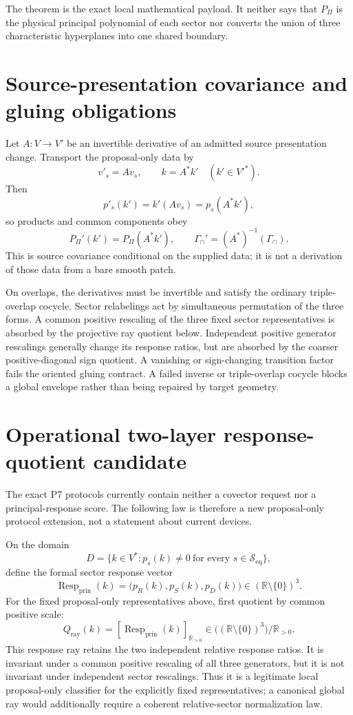 \documentclass[11pt]{article}
\newcommand{\RR}{\mathbb R}
\newcommand{\Seq}{\mathcal S_{\mathrm{eq}}}
\newcommand{\Pprod}{P_{\Pi}}
\newcommand{\GammaInt}{\Gamma_{\cap}}
\newcommand{\Resp}{\operatorname{Resp}_{\mathrm{prin}}}
\newcommand{\Qray}{Q_{\mathrm{ray}}}
\begin{document}
The theorem is the exact local mathematical payload.  It neither says that
\(\Pprod\) is the physical principal polynomial of each sector nor converts
the union of three characteristic hyperplanes into one shared boundary.

\section{Source-presentation covariance and gluing obligations}

Let \(A:V\to V'\) be an invertible derivative of an admitted source
presentation change.  Transport the proposal-only data by
\[
 v'_s=A v_s,\qquad k=A^*k'\quad(k'\in V'^*).
\]
Then
\[
 p'_s(k')=k'(A v_s)=p_s(A^*k'),
\]
so products and common components obey
\[
 \Pprod'(k')=\Pprod(A^*k'),
 \qquad
 \GammaInt'=(A^*)^{-1}(\GammaInt).
\]
This is source covariance conditional on the supplied data; it is not a
derivation of those data from a bare smooth patch.

On overlaps, the derivatives must be invertible and satisfy the ordinary
triple-overlap cocycle.  Sector relabelings act by simultaneous permutation of
the three forms.  A common positive rescaling of the three fixed sector
representatives is absorbed by the projective ray quotient below.  Independent
positive generator rescalings generally change its response ratios, but are
absorbed by the coarser positive-diagonal sign quotient.  A vanishing or
sign-changing transition factor fails the oriented gluing contract.  A failed
inverse or triple-overlap cocycle blocks a global envelope rather than being
repaired by target geometry.

\section{Operational two-layer response-quotient candidate}

The exact P7 protocols currently contain neither a covector request nor a
principal-response score.  The following law is therefore a new proposal-only
protocol extension, not a statement about current devices.

On the domain
\[
 D=\{k\in V^*:p_s(k)\ne0\ \text{for every }s\in\Seq\},
\]
define the formal sector response vector
\[
 \Resp(k)=\bigl(p_R(k),p_S(k),p_D(k)\bigr)\in(\RR\setminus\{0\})^3.
\]
For the fixed proposal-only representatives above, first quotient by common
positive scale:
\[
 \Qray(k)=[\Resp(k)]_{\RR_{>0}}\in
 \bigl((\RR\setminus\{0\})^3\bigr)/\RR_{>0}.
\]
This response ray retains the two independent relative response ratios.  It is
invariant under a common positive rescaling of all three generators, but it
is not invariant under independent sector rescalings.  Thus it is a legitimate
local proposal-only classifier for the explicitly fixed representatives; a
canonical global ray would additionally require a coherent relative-sector
normalization law.
\end{document}
